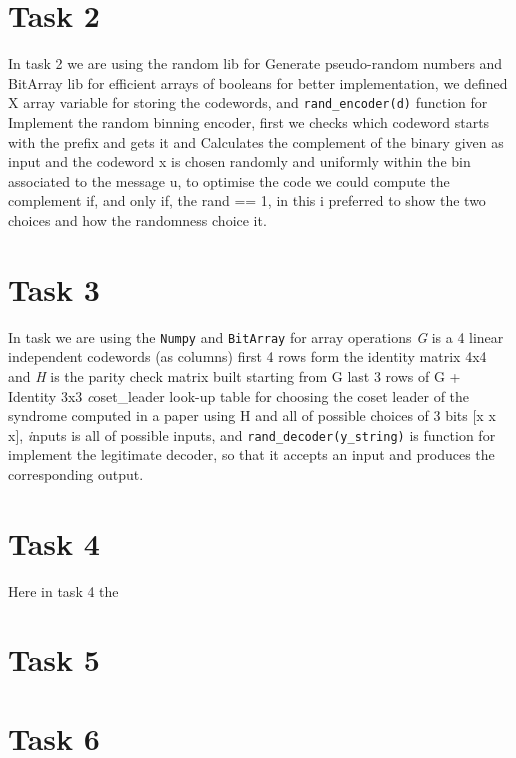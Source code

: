 \documentclass{report}
\begin{document}
  \section*{Task 2}
  In task 2 we are using the random lib for Generate pseudo-random numbers and BitArray lib for efficient arrays of booleans for better implementation, we defined X array variable for storing the codewords, and {\tt rand\_encoder(d)} function for Implement the random binning encoder, first we checks which codeword starts with the prefix and gets it and Calculates the complement of the binary given as input and the codeword x is chosen randomly and uniformly within the bin associated to the message u, to optimise the code we could compute the complement if, and only if, the rand == 1, in this i preferred to show the two choices and how the randomness choice it.
\section*{Task 3}
In task we are using the {\tt Numpy} and {\tt BitArray} for array operations {\textit G}  is a 4 linear independent codewords (as columns)
first 4 rows form the identity matrix 4x4 and {\textit H} is the parity check matrix built starting from G last 3 rows of G + Identity 3x3 {\textit coset\_leader} look-up table for choosing the coset leader of the syndrome computed in a paper using H and all of possible choices of 3 bits [x x x], {\textit inputs} is all of possible inputs, and {\tt rand\_decoder(y\_string)} is function for implement the legitimate decoder, so that it accepts an
input and produces the corresponding output.
\section*{Task 4}
Here in task 4 the 
\section*{Task 5}

\section*{Task 6}
\end{document}
